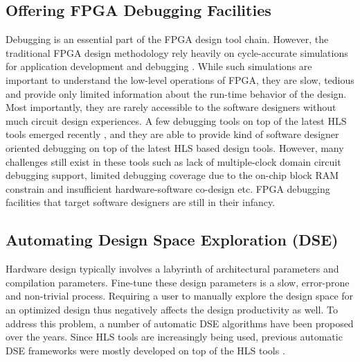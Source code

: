 \subsection{Offering FPGA Debugging Facilities}
Debugging is an essential part of the FPGA design tool chain. However, the traditional FPGA design methodology rely heavily on cycle-accurate simulations for application development and debugging \cite{chipscope, signaltap, certus}. While such simulations are important to understand the low-level operations of FPGA, they are slow, tedious and provide only limited information about the run-time behavior of the design. Most importantly, they are rarely accessible to the software designers without much circuit design experiences. A few debugging tools on top of the latest HLS tools emerged recently \cite{hung2014accelerating, hung2014incremental, panjkov2015hybrid, goeders2014effective}, and they are able to provide kind of software designer oriented debugging on top of the latest HLS based design tools. However, many challenges still exist in these tools such as lack of multiple-clock domain circuit debugging support, limited debugging coverage due to the on-chip block RAM constrain and insufficient hardware-software co-design etc. FPGA debugging facilities that target software designers are still in their infancy. 

\subsection{Automating Design Space Exploration (DSE)}
Hardware design typically involves a labyrinth of architectural parameters and compilation parameters. Fine-tune these design parameters is a slow, error-prone and non-trivial process. Requiring a user to manually explore the design space for an optimized design thus negatively affects the design productivity as well. To address this problem, a number of automatic DSE algorithms have been proposed over the years. Since HLS tools are increasingly being used, previous automatic DSE frameworks were mostly developed on top of the HLS tools \cite{zhong2014design, schafer2012machine, holzer2007design, schafer2012divide, liu2013learning, kurek2014automating}.
 
